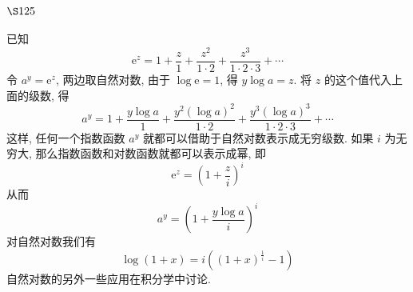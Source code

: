\section{$\S 125$}

已知
\[
\mathrm{e}^{z}=1+\frac{z}{1}+\frac{z^{2}}{1 \cdot 2}+\frac{z^{3}}{1 \cdot 2 \cdot 3}+\cdots
\]
令 $a^{y}=\mathrm{e}^{z}$, 两边取自然对数, 由于 $\log \mathrm{e}=1$, 得 $y \log a=z$. 将 $z$ 的这个值代入上面的级数, 得
\[
a^{y}=1+\frac{y \log a}{1}+\frac{y^{2}(\log a)^{2}}{1 \cdot 2}+\frac{y^{3}(\log a)^{3}}{1 \cdot 2 \cdot 3}+\cdots
\]
这样, 任何一个指数函数 $a^{y}$ 就都可以借助于自然对数表示成无穷级数. 如果 $i$ 为无穷大, 那么指数函数和对数函数就都可以表示成幂, 即
\[
\mathrm{e}^{z}=\left(1+\frac{z}{i}\right)^{i}
\]
从而
\[
a^{y}=\left(1+\frac{y \log a}{i}\right)^{i}
\]
对自然对数我们有
\[
\log (1+x)=i\left((1+x)^{\frac{1}{i}}-1\right)
\]
自然对数的另外一些应用在积分学中讨论. 

